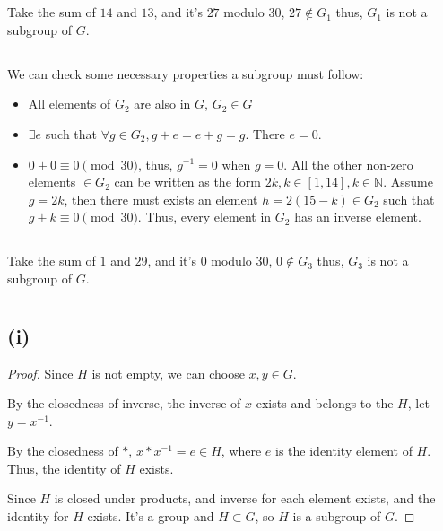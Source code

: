\documentclass[12pt]{article}
\title{\mytitle}
\author{\textbf{\myauthor}}
\date{Due: 24th September 2025}
\begin{document}
\onehalfspacing
\maketitle

\section{} %
\subsection{} %
Take the sum of $14$ and $13$, and it's $27$ modulo $30$, $27\notin G_1$ thus, $G_1$ is not a subgroup of $G$.
\subsection{} %
We can check some necessary properties a subgroup must follow:
\begin{itemize}
    \item All elements of $G_2$ are also in $G$, $G_2\in G$
    \item $\exists e$ such that $\forall g\in G_2,g+e=e+g=g$. There $e=0$.
    \item $0+0\equiv 0\pmod{30}$, thus, $g^{-1}=0$ when $g=0$. All the other non-zero elements $\in G_2$ can be written as the form $2k,k\in[1,14],k\in\mathbb{N}$. Assume $g=2k$, then there must exists an element $h=2(15-k)\in G_2$ such that $g+k\equiv 0\pmod{30}$. Thus, every element in $G_2$ has an inverse element.
\end{itemize}
\subsection{} %
Take the sum of $1$ and $29$, and it's $0$ modulo $30$, $0\notin G_3$ thus, $G_3$ is not a subgroup of $G$.





\newpage
\section{} %
\subsection*{(i)}
\begin{proof}
Since $H$ is not empty, we can choose $x,y\in G$.

By the closedness of inverse, the inverse of $x$ exists and belongs to the $H$, let $y=x^{-1}$.

By the closedness of $*$, $x*x^{-1}=e\in H$, where $e$ is the identity element of $H$. Thus, the identity of $H$ exists.

Since $H$ is closed under products, and inverse for each element exists, and the identity for $H$ exists. It's a group and $H\subset G$, so $H$ is a subgroup of $G$.
\end{proof}
\end{document}
